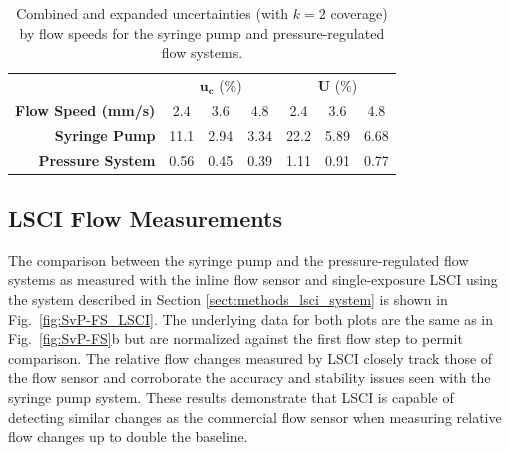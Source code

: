 \documentclass[12pt]{spieman}
\begin{document}
\begin{spacing}{2}
\begin{table}
    \caption {
        Combined and expanded uncertainties (with $k=2$ coverage) by flow speeds for the syringe pump and pressure-regulated flow systems.
    }
    \label{tab:uncertainty_combined}
    \centering
    \begin{tabular}{rcccccc}
        \addlinespace
        \toprule
            &
            \multicolumn{3}{c}{$\boldsymbol{u_c}$ (\%)}     &
            \multicolumn{3}{c}{$\boldsymbol{U}$ (\%)}       \\
            \cmidrule(lr){2-4}
            \cmidrule(lr){5-7}
        \textbf{Flow Speed (mm/s)} & 2.4    & 3.6   & 4.8   & 2.4   & 3.6   & 4.8   \\
        \midrule
        \textbf{Syringe Pump}      & 11.1   & 2.94  & 3.34  & 22.2  & 5.89  & 6.68  \\
        \textbf{Pressure System}   & 0.56   & 0.45  & 0.39  & 1.11  & 0.91  & 0.77  \\
        \bottomrule
    \end{tabular}
\end{table}


\subsection{LSCI Flow Measurements}
\label{sect:results_lsci_measure}

The comparison between the syringe pump and the pressure-regulated flow systems as measured with the inline flow sensor and single-exposure LSCI using the system described in Section \ref{sect:methods_lsci_system} is shown in Fig.~\ref{fig:SvP-FS_LSCI}. The underlying data for both plots are the same as in Fig.~\ref{fig:SvP-FS}b but are normalized against the first flow step to permit comparison. The relative flow changes measured by LSCI closely track those of the flow sensor and corroborate the accuracy and stability issues seen with the syringe pump system. These results demonstrate that LSCI is capable of detecting similar changes as the commercial flow sensor when measuring relative flow changes up to double the baseline. 


\end{spacing}
\end{document}
